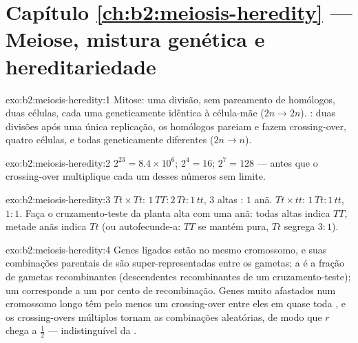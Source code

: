 \section*{Capítulo \ref{ch:b2:meiosis-heredity} --- Meiose, mistura genética e hereditariedade}

\begin{solution}{exo:b2:meiosis-heredity:1}
Mitose: uma divisão, sem pareamento de homólogos, duas células, cada
uma geneticamente idêntica à célula-mãe ($2n \to 2n$). : duas
divisões após uma única replicação, os homólogos pareiam e fazem
crossing-over, quatro células,  e todas geneticamente
diferentes ($2n \to n$).
\end{solution}

\begin{solution}{exo:b2:meiosis-heredity:2}
$2^{23} = 8.4\times 10^{6}$; $2^{4} = 16$; $2^{7} = 128$ --- antes que
o crossing-over multiplique cada um desses números sem limite.
\end{solution}

\begin{solution}{exo:b2:meiosis-heredity:3}
$Tt\times Tt$:  $1\,TT : 2\,Tt : 1\,tt$,  $3$
altas : $1$ anã. $Tt\times tt$: $1\,Tt : 1\,tt$, $1 : 1$. Faça o
cruzamento-teste da planta alta com uma anã: todas altas indica $TT$,
metade anãs indica $Tt$ (ou autofecunde-a: $TT$ se mantém pura, $Tt$
segrega $3 : 1$).
\end{solution}

\begin{solution}{exo:b2:meiosis-heredity:4}
Genes ligados estão no mesmo cromossomo, e suas combinações parentais
de  são super-representadas entre os gametas; a  é a fração de gametas recombinantes (descendentes
recombinantes de um cruzamento-teste); um  corresponde a um
por cento de recombinação. Genes muito afastados num cromossomo longo
têm pelo menos um crossing-over entre eles em quase toda , e os
crossing-overs múltiplos tornam as combinações aleatórias, de modo que
$r$ chega a $\tfrac12$ --- indistinguível da .
\end{solution}

